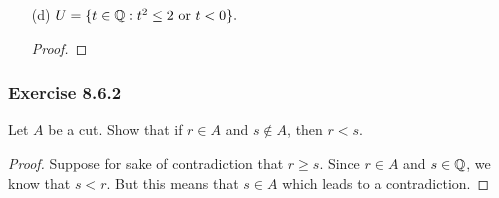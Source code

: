 \begin{enumerate}
\begin{proof}[Solution]
        Next, we show (C2). Let \( r \in T  \). Then by definition of \( T  \), we must have either \( r^{2} < 2  \) or \( r < 0  \). If \( r < 0  \), then we can easily pick \(  q < r  \) for any \( q < 0  \). Otherwise, we have \( r^{2} < 2  \) such that if we let \( q \in \Q  \) be arbitrary with \( q^{2} < r^{2}  \). Then we easily have \( q < r  \).

        Finally, we show (C3). Let \( r \in T  \). Then either we have \( r^{2} < 2  \) or \( r < 0  \). Consider 
        \begin{align*}
           \Big( r + \frac{ 1 }{ n }  \Big)^{2} &= r^{2} + \frac{ 2r }{ n }  + \frac{ 1 }{ n }  \\
                                                &= r^{2} +  \frac{ 2r + 1  }{ n  }.  \\
        \end{align*}
        Let us set \( s = r + \frac{ 1 }{ n_{0} }   \). If \( r > 0  \), then we can pick an \( n_{0}  \) large enough such that 
        \[ \frac{ 1 }{ n_{0}  }  < \frac{ 4 - r^{2}  }{ 2r+1  }.   \]
        Then we have 
        \[  \Big( r + \frac{ 1 }{ n_{0} }  \Big)^{2} < r^{2} + \frac{ 2r+1 }{ n_{0} } < r^{2} + \frac{ 2r+1 }{ n_{0}  }  \cdot \frac{ 4 - r^{2} }{ 2r+1 } < 4. \]
        Hence, we have \( r < s < 2   \). Otherwise, we choose \( n_{0 }  \) large enough so that 
        \[  \frac{ 1 }{ n_{0}  }  < \frac{ -r^{2} }{  2r+1 }. \] Then we have 
        \[  \Big( r + \frac{ 1 }{ n_{0} }  \Big)^{2} < r^{2} + \frac{ 2r+1 }{ n_{0} }  < 0. \]
         This implies that \( r < s < 0  \). 
     \end{proof}


    \item[(d)] \( U = \{ t \in \mathbb{Q} : t^{2} \leq 2 \ \text{or} \ t < 0  \}.  \)
            \begin{proof}
            
            \end{proof}
\end{enumerate}

\subsubsection{Exercise 8.6.2} 
Let \( A  \) be a cut. Show that if \( r \in  A \) and \( s \notin A  \), then \( r < s  \).
\begin{proof}
Suppose for sake of contradiction that \( r \geq s  \). Since \( r \in A  \) and \( s \in \mathbb{Q}  \), we know that \( s < r   \). But this means that \( s \in A  \) which leads to a contradiction.
\end{proof}

